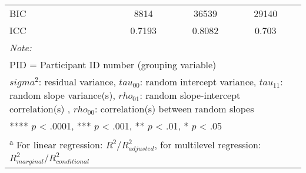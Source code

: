 \begin{landscape}
\begin{table}
\begin{minipage}[t][\textheight][t]{\textwidth}
{\begin{tabular}[t]{lcccccccccccc}
BIC &  &  &  &  &  &  & 8814 &  & 36539 &  & 29140 & \\
ICC &  &  &  &  &  &  & 0.7193 &  & 0.8082 &  & 0.703 & \\
\bottomrule
\multicolumn{13}{l}{\rule{0pt}{1em}\textit{Note: }}\\
\multicolumn{13}{l}{\rule{0pt}{1em}PID = Participant ID number (grouping variable)}\\
\multicolumn{13}{l}{\rule{0pt}{1em}$sigma^2$: residual variance, $tau_{00}$: random intercept variance, $tau_{11}$: random slope variance(s), $rho_{01}$: random slope-intercept correlation(s) , $rho_{00}$: correlation(s) between random slopes}\\
\multicolumn{13}{l}{\rule{0pt}{1em}**** $p$ < .0001, *** $p$ < .001, ** $p$ < .01, * $p$ < .05}\\
\multicolumn{13}{l}{\rule{0pt}{1em}\textsuperscript{a} For linear regression: $R^2 / R^2_{adjusted}$, for multilevel regression: $R^2_{marginal} / R^2_{conditional}$ }\\
\end{tabular}}
\end{minipage}
\end{table}
\end{landscape}
